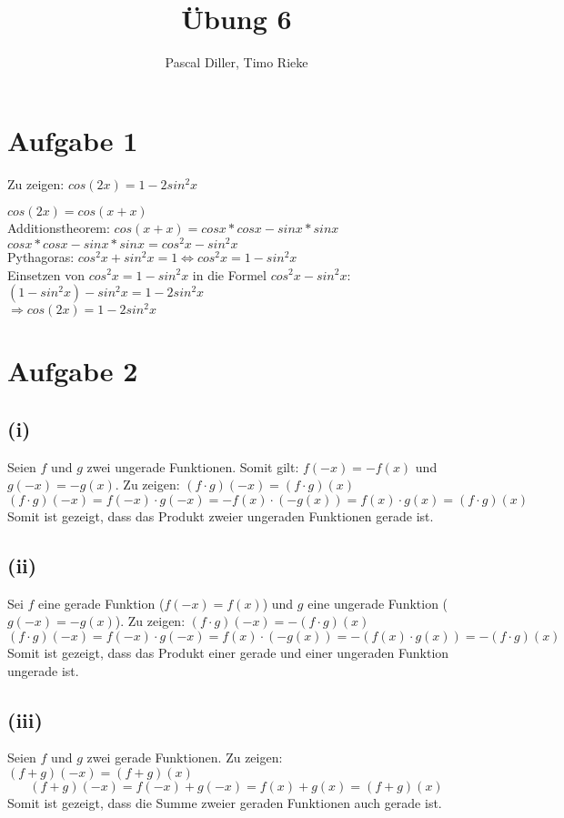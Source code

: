 \documentclass{article}
\title{Übung 6}
\author{Pascal Diller, Timo Rieke}
\begin{document}
\maketitle

\section{Aufgabe 1}
Zu zeigen: $cos(2x) = 1 - 2 sin^2 x$ 
\begin{center}
    $cos(2x) = cos(x+x)$ \\
    Additionstheorem: $cos(x+x) = cos x * cosx - sinx* sinx$ \\
    $cosx*cosx-sinx*sinx = cos^2x - sin^2x$ \\
    Pythagoras: $cos^2x+sin^2x=1 \Longleftrightarrow cos^2x = 1-sin^2x$ \\
    Einsetzen von $cos^2x = 1-sin^2x$ in die Formel $cos^2x - sin^2x$:\\
    $(1-sin^2x) - sin^2x = 1- 2sin^2x$\\
    $\Longrightarrow cos(2x) = 1-2sin^2x$ 
\end{center}

\section{Aufgabe 2}
\subsection{(i)}
Seien $f$ und $g$ zwei ungerade Funktionen. Somit gilt: $f(-x) = -f(x)$ und $g(-x) = -g(x)$. Zu zeigen: $(f \cdot g)(-x) = (f \cdot g)(x)$
\[(f \cdot g)(-x) = f(-x) \cdot g(-x) = -f(x) \cdot (-g(x)) = f(x) \cdot g(x) = (f \cdot g)(x)\]
Somit ist gezeigt, dass das Produkt zweier ungeraden Funktionen gerade ist.

\subsection{(ii)}
Sei $f$ eine gerade Funktion ($f(-x)=f(x)$) und $g$ eine ungerade Funktion ($g(-x)=-g(x)$).
Zu zeigen: $(f \cdot g)(-x) = -(f \cdot g)(x)$
\[(f \cdot g)(-x) = f(-x) \cdot g(-x) = f(x) \cdot (-g(x)) = -(f(x) \cdot g(x)) = -(f \cdot g)(x)\]
Somit ist gezeigt, dass das Produkt einer gerade und einer ungeraden Funktion ungerade ist.

\subsection{(iii)}
Seien $f$ und $g$ zwei gerade Funktionen. Zu zeigen: $(f + g)(-x) = (f + g)(x)$
\[(f + g)(-x) = f(-x) + g(-x) = f(x) + g(x) = (f+g)(x)\]
Somit ist gezeigt, dass die Summe zweier geraden Funktionen auch gerade ist.
\end{document}
